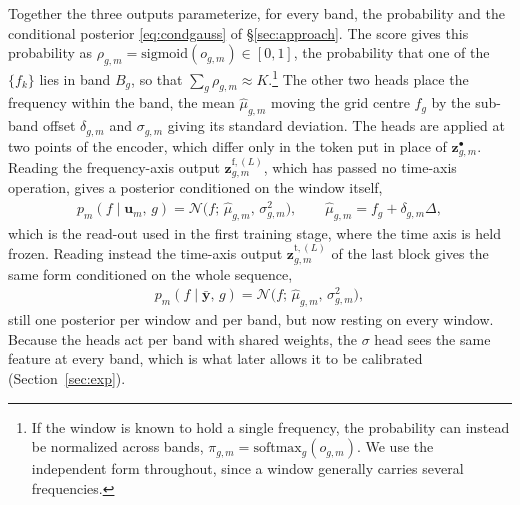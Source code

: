 \documentclass[journal,onecolumn]{IEEEtran}
\begin{document}
Together the three outputs parameterize, for every band, the probability and the conditional posterior \eqref{eq:condgauss} of \S\ref{sec:approach}. The score gives this probability as $\rho_{g,m}=\mathrm{sigmoid}(o_{g,m})\in[0,1]$, the probability that one of the $\{f_k\}$ lies in band $B_g$, so that $\sum_g\rho_{g,m}\approx K$.\footnote{If the window is known to hold a single frequency, the probability can instead be normalized across bands, $\pi_{g,m}=\mathrm{softmax}_g(o_{g,m})$. We use the independent form throughout, since a window generally carries several frequencies.} The other two heads place the frequency within the band, the mean $\hat\mu_{g,m}$ moving the grid centre $f_g$ by the sub-band offset $\delta_{g,m}$ and $\sigma_{g,m}$ giving its standard deviation. The heads are applied at two points of the encoder, which differ only in the token put in place of $\mathbf{z}^{\bullet}_{g,m}$. Reading the frequency-axis output $\mathbf{z}^{\mathrm{f},(L)}_{g,m}$, which has passed no time-axis operation, gives a posterior conditioned on the window itself,
\begin{eqnarray}
\label{eq:localpost}
p_m(f\mid\mathbf{u}_m,\,g)=\mathcal{N}\!\big(f;\,\hat\mu_{g,m},\,\sigma_{g,m}^2\big),
\qquad \hat\mu_{g,m}=f_g+\delta_{g,m}\Delta,
\end{eqnarray}
which is the read-out used in the first training stage, where the time axis is held frozen. Reading instead the time-axis output $\mathbf{z}^{\mathrm{t},(L)}_{g,m}$ of the last block gives the same form conditioned on the whole sequence,
\begin{eqnarray}
\label{eq:winpost}
p_m(f\mid\bar{\mathbf{y}},\,g)=\mathcal{N}\!\big(f;\,\hat\mu_{g,m},\,\sigma_{g,m}^2\big),
\end{eqnarray}
still one posterior per window and per band, but now resting on every window. Because the heads act per band with shared weights, the $\sigma$ head sees the same feature at every band, which is what later allows it to be calibrated (Section~\ref{sec:exp}).
\end{document}

